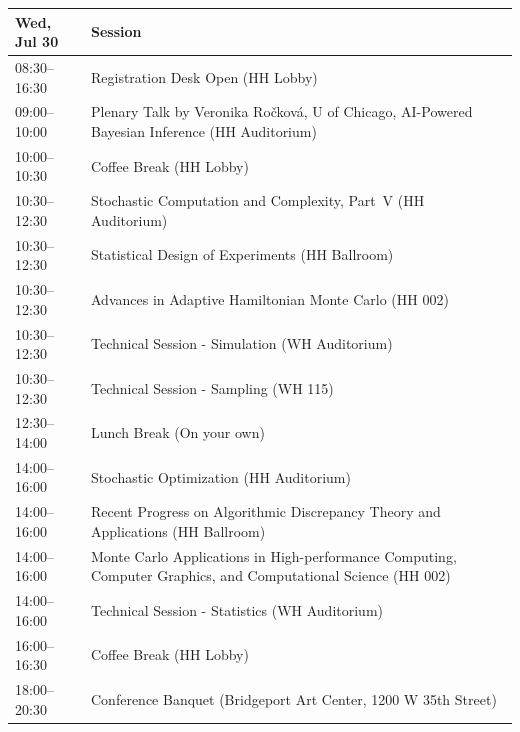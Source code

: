 \begin{table}
{\footnotesize
\begin{tabularx}{\textwidth}{>{\hsize=0.32\hsize}X|>{\hsize=1.7\hsize}X}
\hline
\textbf{Wed, Jul 30} & \textbf{Session} \\
\hline
\cellcolor{\EmptyColor}08:30--16:30 & \cellcolor{\EmptyColor}Registration Desk Open (HH Lobby) \\
\cellcolor{\PlenaryColor}09:00--10:00 & \cellcolor{\PlenaryColor}Plenary Talk by Veronika Ro\v{c}kov\'a, U of Chicago, AI-Powered Bayesian Inference (HH Auditorium) \\
\cellcolor{\EmptyColor}10:00--10:30 & \cellcolor{\EmptyColor}Coffee Break (HH Lobby) \\
\cellcolor{\SessionTitleColor}10:30--12:30 & \cellcolor{\SessionTitleColor}Stochastic Computation and Complexity, Part~V (HH Auditorium) \\
\cellcolor{\SessionTitleColor}10:30--12:30 & \cellcolor{\SessionTitleColor}Statistical Design of Experiments (HH Ballroom) \\
\cellcolor{\SessionTitleColor}10:30--12:30 & \cellcolor{\SessionTitleColor}Advances in Adaptive Hamiltonian Monte Carlo (HH 002) \\
\cellcolor{\SessionLightColor}10:30--12:30 & \cellcolor{\SessionLightColor}Technical Session - Simulation (WH Auditorium) \\
\cellcolor{\SessionLightColor}10:30--12:30 & \cellcolor{\SessionLightColor}Technical Session - Sampling (WH 115) \\
\cellcolor{\EmptyColor}12:30--14:00 & \cellcolor{\EmptyColor}Lunch Break (On your own) \\
\cellcolor{\SessionTitleColor}14:00--16:00 & \cellcolor{\SessionTitleColor}Stochastic Optimization (HH Auditorium) \\
\cellcolor{\SessionTitleColor}14:00--16:00 & \cellcolor{\SessionTitleColor}Recent Progress on Algorithmic Discrepancy Theory and Applications (HH Ballroom) \\
\cellcolor{\SessionTitleColor}14:00--16:00 & \cellcolor{\SessionTitleColor}Monte Carlo Applications in High-performance Computing, Computer Graphics, and Computational Science (HH 002) \\
\cellcolor{\SessionLightColor}14:00--16:00 & \cellcolor{\SessionLightColor}Technical Session - Statistics (WH Auditorium) \\
\cellcolor{\EmptyColor}16:00--16:30 & \cellcolor{\EmptyColor}Coffee Break (HH Lobby) \\
\cellcolor{\SessionTitleColor}18:00--20:30 & \cellcolor{\SessionTitleColor}Conference Banquet (Bridgeport Art Center, 1200 W 35th Street) \\
\hline
\end{tabularx}
}
\end{table}

